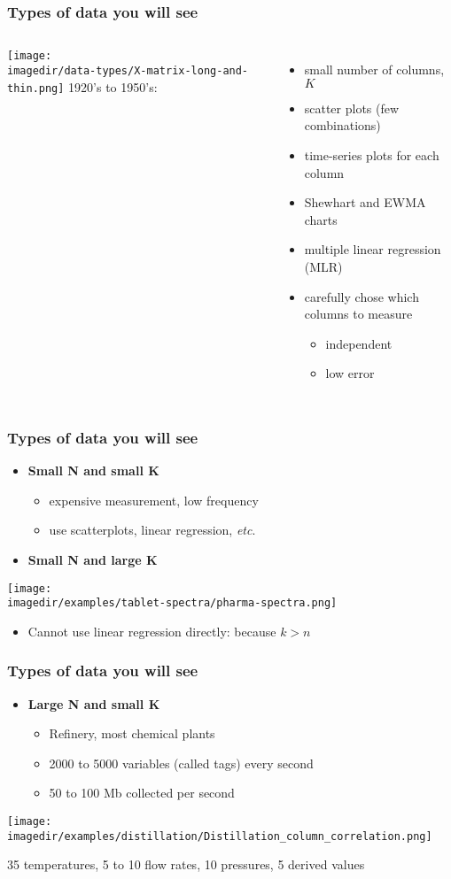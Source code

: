 \begin{frame}\frametitle{Types of data you will see}
	\begin{columns}
		\column{4cm}
		\texttt{[image: \\imagedir/data-types/X-matrix-long-and-thin.png]} \column{6cm} 1920's to 1950's:
		\begin{itemize}
			\item	small number of columns, $K$
			\item	scatter plots (few combinations)
			\item	time-series plots for each column
			\item	Shewhart and EWMA charts
			\item	multiple linear regression (MLR)
			\item	carefully chose which columns to measure
			\begin{itemize}
				\item	independent
				\item	low error
			\end{itemize}
		\end{itemize}
	\end{columns}
\end{frame}

\begin{frame}\frametitle{Types of data you will see}
	\begin{itemize}
		\item	\textbf{Small N and small K}
		\begin{itemize}
			\item	expensive measurement, low frequency
			\item	use scatterplots, linear regression, \emph{etc}.
		\end{itemize}
		\item	\textbf{Small N and large K}
	\end{itemize}

	\texttt{[image: \\imagedir/examples/tablet-spectra/pharma-spectra.png]}
	\begin{itemize}
		\item	Cannot use linear regression directly: because $k > n$
	\end{itemize}
\end{frame}

\begin{frame}\frametitle{Types of data you will see}
	\begin{itemize}
		\item	\textbf{Large N and small K}
		\begin{itemize}
			\item	Refinery, most chemical plants
			\item	2000 to 5000 variables (called tags) every second
			\item	50 to 100 Mb collected per second
		\end{itemize}
	\end{itemize}

	\texttt{[image: \\imagedir/examples/distillation/Distillation\_column\_correlation.png]}

	35 temperatures, 5 to 10 flow rates, 10 pressures, 5 derived values
\end{frame}

